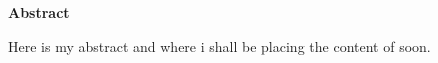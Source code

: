 
\begin{center}
{\Large\textbf{Abstract}}
\end{center}

Here is my abstract and where i shall be placing the content of soon.



	
	
	
	
